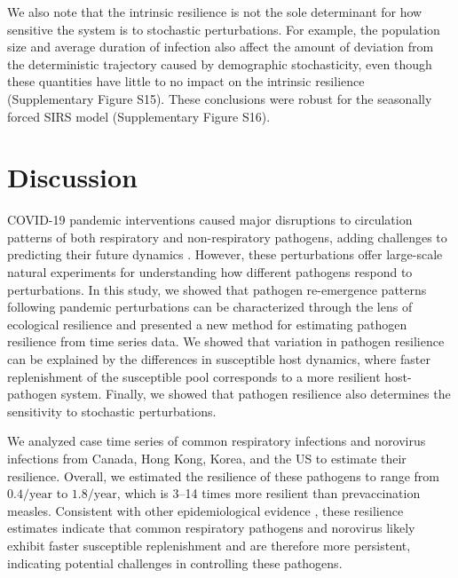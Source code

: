 \documentclass[12pt]{article}
\begin{document}
We also note that the intrinsic resilience is not the sole determinant for how sensitive the system is to stochastic perturbations.
For example, the population size and average duration of infection also affect the amount of deviation from the deterministic trajectory caused by demographic stochasticity, even though these quantities have little to no impact on the intrinsic resilience (Supplementary Figure S15).
These conclusions were robust for the seasonally forced SIRS model (Supplementary Figure S16).

\section*{Discussion}

COVID-19 pandemic interventions caused major disruptions to circulation patterns of both respiratory and non-respiratory pathogens, adding challenges to predicting their future dynamics \citep{baker2020impact,gomez2021uncertain,koltai2022determinants,park2024predicting}.
However, these perturbations offer large-scale natural experiments for understanding how different pathogens respond to perturbations.
In this study, we showed that pathogen re-emergence patterns following pandemic perturbations can be characterized through the lens of ecological resilience and presented a new method for estimating pathogen resilience from time series data.
We showed that variation in pathogen resilience can be explained by the differences in susceptible host dynamics, where faster replenishment of the susceptible pool corresponds to a more resilient host-pathogen system.
Finally, we showed that pathogen resilience also determines the sensitivity to stochastic perturbations.

We analyzed case time series of common respiratory infections and norovirus infections from Canada, Hong Kong, Korea, and the US to estimate their resilience.
Overall, we estimated the resilience of these pathogens to range from $0.4/\mathrm{year}$ to $1.8/\mathrm{year}$, which is 3--14 times more resilient than prevaccination measles.
Consistent with other epidemiological evidence \citep{bosis2008role,o2009symptomatic,pitzer2015environmental,edridge2020seasonal}, these resilience estimates indicate that common respiratory pathogens and norovirus likely exhibit faster susceptible replenishment and are therefore more persistent, indicating potential challenges in controlling these pathogens.
\end{document}
